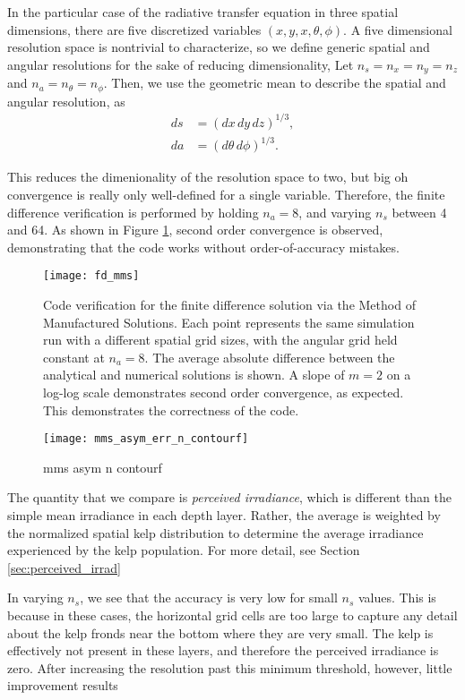 In the particular case of the radiative transfer equation in three spatial dimensions,
there are five discretized variables $(x,y,x,\theta,\phi)$.
A five dimensional resolution space is nontrivial to characterize, so we define generic spatial and angular resolutions for the sake of reducing dimensionality,
Let $n_s = n_x = n_y = n_z$ and $n_a = n_\theta = n_\phi$.
Then, we use the geometric mean to describe the spatial and angular resolution, as
\begin{align}
  ds &= (dx\, dy\, dz)^{1/3}, \\
  da &= (d\theta\, d\phi)^{1/3}.
\end{align}

This reduces the dimenionality of the resolution space to two, but big oh convergence is really only well-defined for a single variable.
Therefore, the finite difference verification is performed by holding $n_a=8$, and varying $n_s$ between 4 and 64.
As shown in Figure \ref{fig:fd_mms}, second order convergence is observed, demonstrating that the code works without order-of-accuracy mistakes.

\begin{figure}[H]
  \centering
  \texttt{[image: fd\_mms]}
  \caption{Code verification for the finite difference solution via the Method of Manufactured Solutions. Each point represents the same simulation run with a different spatial grid sizes, with the angular grid held constant at $n_a=8$. The average absolute difference between the analytical and numerical solutions is shown. A slope of $m=2$ on a log-log scale demonstrates second order convergence, as expected. This demonstrates the correctness of the code.}
  \label{fig:fd_mms}
\end{figure}

\begin{figure}[H]
  \centering
  \texttt{[image: mms\_asym\_err\_n\_contourf]}
  \caption{mms asym n contourf}
  \label{fig:mms_asym_err_n_contourf}
\end{figure}

The quantity that we compare is \textit{perceived irradiance}, which is different than the simple mean irradiance in each depth layer.
Rather, the average is weighted by the normalized spatial kelp distribution to determine the average irradiance experienced by the kelp population.
For more detail, see Section \ref{sec:perceived_irrad}

In varying $n_s$, we see that the accuracy is very low for small $n_s$ values.
This is because in these cases, the horizontal grid cells are too large to capture any detail
about the kelp fronds near the bottom where they are very small.
The kelp is effectively not present in these layers, and therefore the perceived irradiance is zero.
After increasing the resolution past this minimum threshold, however, little improvement results

